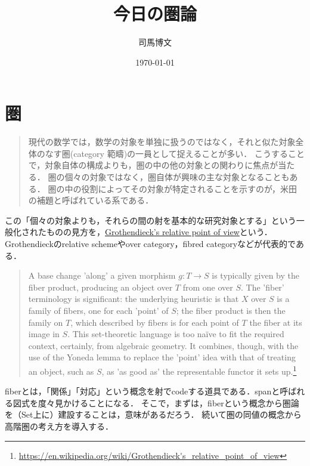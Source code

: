 \documentclass[uplatex,dvipdfmx]{jsreport}
\title{今日の圏論}
\author{司馬博文}
\date{\today}
\begin{document}
\tableofcontents

\chapter{圏}

\begin{tcolorbox}[colframe=ForestGreen, colback=ForestGreen!10!white, breakable ,colbacktitle=ForestGreen!40!white, coltitle=black,fonttitle=\bfseries\sffamily,
    title=Grothendieck's relative point of view]
    \begin{quote}
        現代の数学では，数学の対象を単独に扱うのではなく，それと似た対象全体のなす圏(category 範疇)の一員として捉えることが多い．
        こうすることで，対象自体の構成よりも，圏の中の他の対象との関わりに焦点が当たる．
        圏の個々の対象ではなく，圏自体が興味の主な対象となることもある．
        圏の中の役割によってその対象が特定されることを示すのが，米田の補題と呼ばれている系である．\cite{数学原論}
    \end{quote}
    この「個々の対象よりも，それらの間の射を基本的な研究対象とする」という一般化されたものの見方を，\href{https://en.wikipedia.org/wiki/Grothendieck's_relative_point_of_view}{Grothendieck's relative point of view}という．Grothendieckのrelative schemeやover category，fibred categoryなどが代表的である．
    \begin{quote}
        A base change 'along' a given morphism
        $g:T\to S$
        is typically given by the fiber product, producing an object over $T$ from one over $S$.
        The 'fiber' terminology is significant: the underlying heuristic is that $X$ over $S$ is a family of fibers, one for each 'point' of $S$; the fiber product is then the family on $T$, which described by fibers is for each point of $T$ the fiber at its image in $S$.
        This set-theoretic language is too naïve to fit the required context, certainly, from algebraic geometry. It combines, though, with the use of the Yoneda lemma to replace the 'point' idea with that of treating an object, such as $S$, as 'as good as' the representable functor it sets up.\footnote{\url{https://en.wikipedia.org/wiki/Grothendieck's_relative_point_of_view}}
    \end{quote}
    fiberとは，「関係」「対応」という概念を射でcodeする道具である．spanと呼ばれる図式を度々見かけることになる．
    そこで，まずは，fiberという概念から圏論を（Set上に）建設することは，意味があるだろう．
    続いて圏の同値の概念から高階圏の考え方を導入する．
\end{tcolorbox}
\end{document}
